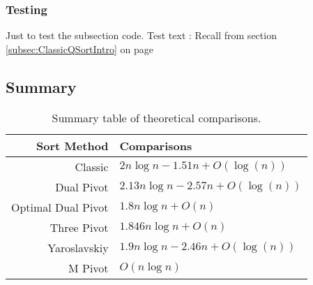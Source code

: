 		\subsubsection{Testing}
			Just to test the subsection code.
			Test text : Recall from section \ref{subsec:ClassicQSortIntro} on page \pageref{subsec:ClassicQSortIntro}

	\subsection{Summary}
		\begin{table}
			\begin{center}
				\begin{tabular}{|r|l|}
					\hline
					Sort Method        &   Comparisons                          \\ \hline \hline
					Classic            &   $2n \log n - 1.51n  + O(\log(n))$    \\ \hline
					Dual Pivot         &   $2.13n \log n - 2.57n + O(\log(n))$  \\ \hline
					Optimal Dual Pivot &   $1.8n \log n + O(n)$                 \\ \hline
					Three Pivot        &   $1.846n \log n + O(n)$               \\ \hline
					Yaroslavskiy       &   $1.9n \log n - 2.46n + O(\log(n))$   \\ \hline
					M Pivot            &   $O(n \log n)$                        \\ \hline
				\end{tabular}
				\caption{Summary table of theoretical comparisons.}
				\label{tab:CompSummary}
			\end{center}
		\end{table}

